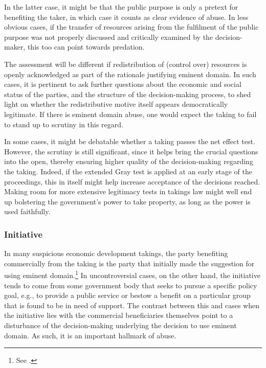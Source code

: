 In the latter case, it might be that the public purpose is only a pretext for benefiting the taker, in which case it counts as clear evidence of abuse. In less obvious cases, if the transfer of resources arising from the fulfilment of the public purpose was not properly discussed and critically examined by the decision-maker, this too can point towards predation.

The assessment will be different if redistribution of (control over) resources is openly acknowledged as part of the rationale justifying eminent domain. In such cases, it is pertinent to ask further  questions about the economic and social status of the parties, and the structure of the decision-making process, to shed light on whether the redistributive motive itself appears democratically legitimate. If there is eminent domain abuse, one would expect the taking to fail to stand up to scrutiny in this regard.

In some cases, it might be debatable whether a taking passes the net effect test. However, the scrutiny is still significant, since it helps bring the crucial questions into the open, thereby ensuring higher quality of the decision-making regarding the taking. Indeed, if the extended Gray test is applied at an early stage of the proceedings, this in itself might help increase acceptance of the decisions reached. Making room for more extensive legitimacy tests in takings law might well end up bolstering the government's power to take property, as long as the power is used faithfully.

\subsubsection*{Initiative}

In many suspicious economic development takings, the party benefiting commercially from the taking is the party that initially made the suggestion for using eminent domain.\footnote{See \cite[32]{gray11}.} In uncontroversial cases, on the other hand, the initiative tends to come from some government body that seeks to pursue a specific policy goal, e.g., to provide a public service or bestow a benefit on a particular group that is found to be in need of support. The contrast between this and cases when the initiative lies with the commercial beneficiaries themselves point to a disturbance of the decision-making underlying the decision to use eminent domain. As such, it is an important hallmark of abuse.

